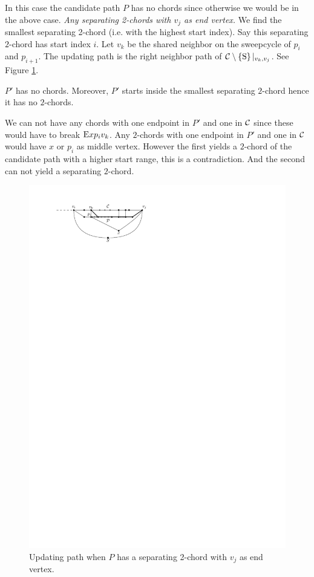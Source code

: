    In this case the candidate path $P$ has no chords since otherwise we would be in the above case.
    \emph{Any separating 2-chords with $v_j$ as end vertex.}
      We find the smallest separating 2-chord (i.e. with the highest start index). Say this separating $2$-chord has start index $i$.
      Let $v_k$ be the shared neighbor on the sweepcycle of $p_{i}$ and $p_{i +1}$. The updating path is the right neighbor path of $\mathcal{C} \setminus \left\lbrace {\mathrm{S}} \right\rbrace|_{v_k, v_j}$. See Figure \ref{fig:sweep:pEBound}.

      $P'$ has no chords. Moreover, $P'$ starts inside the smallest separating $2$-chord hence it has no $2$-chords.

      We can not have any chords with one endpoint in $P'$ and one in $\mathcal{C}$  since these would have to break $\mathrm{E} x p_i v_k$. Any $2$-chords with one endpoint in $P'$ and one in $\mathcal{C}$ would have $x$ or $p_i$ as middle vertex. However the first yields a $2$-chord of the candidate path with a higher start range, this is a contradiction. And the second can not yield a separating $2$-chord.

    \begin{figure}[h]
      \centering
      \includegraphics[scale=1]{unifiedAlgo/img/sweep/pEBound}
      \caption{Updating path when $P$ has a separating 2-chord with $v_j$ as end vertex.}
      \label{fig:sweep:pEBound}
    \end{figure}

